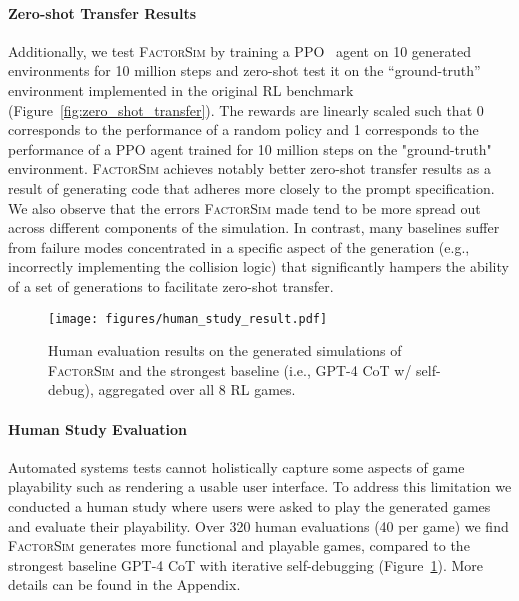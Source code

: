 \documentclass{article}
\theoremstyle{plain}
\theoremstyle{definition}
\theoremstyle{remark}
\newcommand{\method}{\textsc{FactorSim}\xspace}
\begin{document}
\paragraph{Zero-shot Transfer Results} Additionally, we test \method by training a PPO~\cite{schulman2017proximal} agent on 10 generated environments for 10 million steps and zero-shot test it on the ``ground-truth'' environment implemented in the original RL benchmark (Figure~\ref{fig:zero_shot_transfer}).
The rewards are linearly scaled such that 0 corresponds to the performance of a random policy and 1 corresponds to the performance of a PPO agent trained for 10 million steps on the "ground-truth" environment. \method achieves notably better zero-shot transfer results as a result of generating code that adheres more closely to the prompt specification. We also observe that the errors \method made tend to be more spread out across different components of the simulation. In contrast, many baselines suffer from failure modes concentrated in a specific aspect of the generation (e.g., incorrectly implementing the collision logic) that significantly hampers the ability of a set of generations to facilitate zero-shot transfer.





\begin{figure}[!t] \centering
\texttt{[image: figures/human\_study\_result.pdf]}
    \caption{Human evaluation results on the generated simulations of \method and the strongest baseline (i.e., GPT-4 CoT w/ self-debug), aggregated over all 8 RL games.}
\label{fig:human_study_result}
\end{figure}
\paragraph{Human Study Evaluation} 
Automated systems tests cannot holistically capture some aspects of game playability such as rendering a usable user interface.
To address this limitation we conducted a human study where users were asked to play the generated games and evaluate their playability.
Over 320 human evaluations (40 per game) we find \method generates more functional and playable games, compared to the strongest baseline GPT-4 CoT with iterative self-debugging (Figure~\ref{fig:human_study_result}).
More details can be found in the Appendix.
\end{document}
